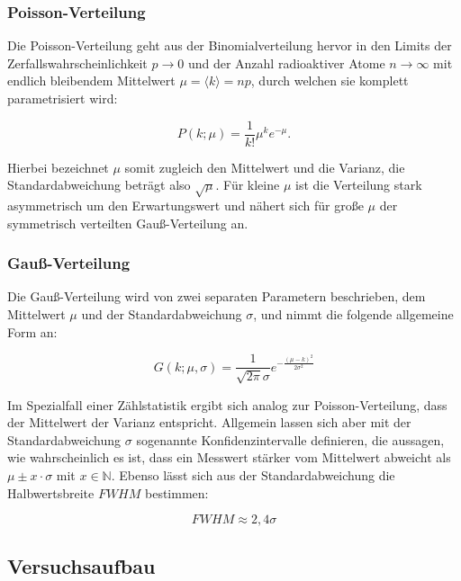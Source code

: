 \documentclass{article}
\begin{document}
\subsubsection{Poisson-Verteilung}

Die Poisson-Verteilung geht aus der Binomialverteilung hervor in den Limits der Zerfallswahrscheinlichkeit $p \rightarrow 0$ und der Anzahl radioaktiver Atome $n \rightarrow \infty$ mit endlich bleibendem Mittelwert $\mu = \langle k \rangle = np$, durch welchen sie komplett parametrisiert wird:

\begin{equation}
    P(k;\mu) = \frac{1}{k!} \mu^k e^{-\mu}.
\end{equation}

Hierbei bezeichnet $\mu$ somit zugleich den Mittelwert und die Varianz, die Standardabweichung beträgt also $\sqrt{\mu}$. Für kleine $\mu$ ist die Verteilung stark asymmetrisch um den Erwartungswert und nähert sich für große $\mu$ der symmetrisch verteilten Gauß-Verteilung an.

\subsubsection{Gauß-Verteilung}

Die Gauß-Verteilung wird von zwei separaten Parametern beschrieben, dem Mittelwert $\mu$ und der Standardabweichung $\sigma$, und nimmt die folgende allgemeine Form an:

\begin{equation}
    G(k; \mu, \sigma) = \frac{1}{\sqrt{2 \pi} \sigma} e^{-\frac{(\mu - k)^2}{2 \sigma^2}}
\end{equation}

Im Spezialfall einer Zählstatistik ergibt sich analog zur Poisson-Verteilung, dass der Mittelwert der Varianz entspricht. Allgemein lassen sich aber mit der Standardabweichung $\sigma$ sogenannte Konfidenzintervalle definieren, die aussagen, wie wahrscheinlich es ist, dass ein Messwert stärker vom Mittelwert abweicht als $\mu \pm x \cdot \sigma$ mit $x \in \mathbb{N}$. Ebenso lässt sich aus der Standardabweichung die Halbwertsbreite $FWHM$ bestimmen:

\begin{equation}
    FWHM \approx 2,4 \sigma
\end{equation}


\subsection{Versuchsaufbau}
\end{document}
